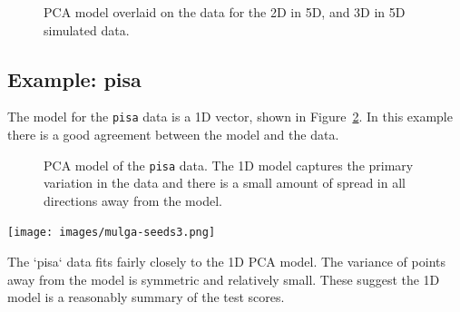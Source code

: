 \documentclass[
  letterpaper,
]{krantz}
\newcommand{\insightbox}[1]{%
\noindent\colorbox{insight!30}{%
\begin{minipage}{0.98\textwidth}%
    \centering%
    \begin{minipage}[c]{0.15\textwidth} %
      \texttt{[image: images/mulga-seeds3.png]} %
    \end{minipage}%
    \hfill %
    \begin{minipage}[c]{0.8\textwidth} %
      \bigskip%
      \textsf{#1}%
      \bigskip%
    \end{minipage}%
    \hspace*{3mm}%
  \end{minipage}%
}%
}
\begin{document}
\begin{figure}
\begin{minipage}{0.50\linewidth}
{}


\end{minipage}%

\caption{\label{fig-plane-box-model-pdf}PCA model overlaid on the data
for the 2D in 5D, and 3D in 5D simulated data. }

\end{figure}%

\subsection{Example: pisa}\label{example-pisa-1}


The model for the \texttt{pisa} data is a 1D vector, shown in
Figure~\ref{fig-pisa-model-pdf}. In this example there is a good
agreement between the model and the data.

\begin{figure}


\caption{\label{fig-pisa-model-pdf}PCA model of the \texttt{pisa} data.
The 1D model captures the primary variation in the data and there is a
small amount of spread in all directions away from the model.
}

\end{figure}%

\insightbox{The `pisa` data fits fairly closely to the 1D PCA model. The variance of points away from the model is symmetric and relatively small. These suggest the 1D model is a reasonably summary of the test scores.}
\end{document}
